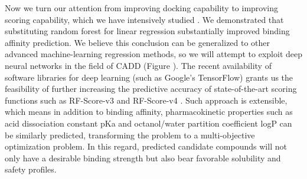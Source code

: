 \documentclass[a4paper,12pt]{article}
\begin{document}


Now we turn our attention from improving docking capability to improving scoring capability, which we have intensively studied \citep{1432,1647,1796,1433,1795,1797,1434,1663}. We demonstrated that substituting random forest for linear regression substantially improved binding affinity prediction. We believe this conclusion can be generalized to other advanced machine-learning regression methods, so we will attempt to exploit deep neural networks in the field of CADD \citep{1810} (Figure ). The recent availability of software libraries for deep learning (such as Google's TensorFlow) grants us the feasibility of further increasing the predictive accuracy of state-of-the-art scoring functions such as RF-Score-v3 \citep{1647} and RF-Score-v4 \citep{1795}. Such approach is extensible, which means in addition to binding affinity, pharmacokinetic properties such as acid dissociation constant pKa and octanol/water partition coefficient logP can be similarly predicted, transforming the problem to a multi-objective optimization problem. In this regard, predicted candidate compounds will not only have a desirable binding strength but also bear favorable solubility and safety profiles.

\end{document}
